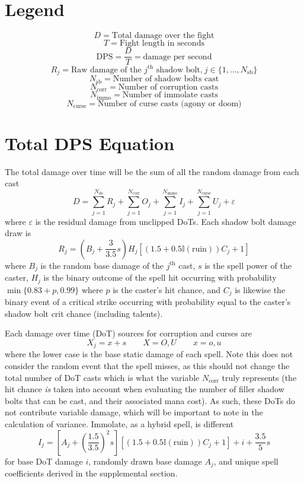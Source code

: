 
\section*{Legend}
$$
D = \text{Total damage over the fight}
$$
$$
T = \text{Fight length in seconds}
$$
$$
\text{DPS} = \frac{D}{T} = \text{damage per second}
$$
$$
R_j = \text{Raw damage of the $j^\text{th}$ shadow bolt,} \ j \in \{ 1, ..., N_\text{sb} \}
$$
$$
N_\text{sb} = \text{Number of shadow bolts cast}
$$
$$
N_\text{corr} = \text{Number of corruption casts}
$$
$$
N_\text{immo} = \text{Number of immolate casts}
$$
$$
N_\text{curse} = \text{Number of curse casts (agony or doom)}
$$


\section*{Total DPS Equation}
%
The total damage over time will be the sum of all the random damage from each cast
%
$$
D = \sum_{j=1}^{N_\text{sb}} R_j + \sum_{j=1}^{N_\text{corr}} O_j + \sum_{j=1}^{N_\text{immo}} I_j + \sum_{j=1}^{N_\text{curse}} U_j + 
\varepsilon
$$
%
where $\varepsilon$ is the residual damage from unclipped DoTs. Each shadow bolt damage draw is
%
$$
R_j = (B_j + \frac{3}{3.5} s) H_j \left[ (1.5 + 0.5 \mathbb{I}(\text{ruin})) C_j + 1 \right]
$$
%
where $B_j$ is the random base damage of the $j^\text{th}$ cast, $s$ is the spell power of the caster, $H_j$ is the binary outcome of the spell hit occurring with probability $\min \{ 0.83 + p, 0.99 \}$ where $p$ is the caster's hit chance, and $C_j$ is likewise the binary event of a critical strike occurring with probability equal to the caster's shadow bolt crit chance (including talents).

Each damage over time (DoT) sources for corruption and curses are
%
$$
X_j = x + s \qquad X = O,U \qquad x = o,u
$$
%
where the lower case is the base static damage of each spell. Note this does not consider the random event that the spell misses, as this should not change the total number of DoT casts which is what the variable $N_\text{corr}$ truly represents (the hit chance \textit{is} taken into account when evaluating the number of filler shadow bolts that can be cast, and their associated mana cost). As such, these DoTs do not contribute variable damage, which will be important to note in the calculation of variance. Immolate, as a hybrid spell, is different
%
$$
I_j = \left[ A_j + (\frac{1.5}{3.5})^2 s \right] [(1.5 + 0.5 \mathbb{I}(\text{ruin})) C_j + 1] + i + \frac{3.5}{5} s
$$
%
for base DoT damage $i$, randomly drawn base damage $A_j$, and unique spell coefficients derived in the supplemental section.

